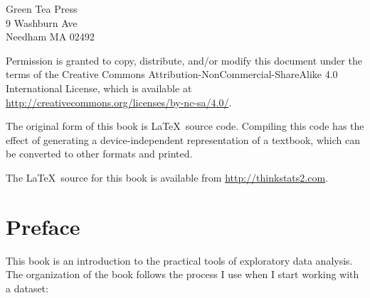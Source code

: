\documentclass[12pt]{book}
\theoremstyle{exercise}
\begin{document}
\begin{titlepage}
{\vspace{0.2in}

\begin{flushleft}
Green Tea Press \\
9 Washburn Ave \\
Needham MA 02492
\end{flushleft}

Permission is granted to copy, distribute, and/or modify this document
under the terms of the Creative Commons
Attribution-NonCommercial-ShareAlike 4.0 International License, which
is available at
\url{http://creativecommons.org/licenses/by-nc-sa/4.0/}.

The original form of this book is \LaTeX\ source code.  Compiling this
code has the effect of generating a device-independent representation
of a textbook, which can be converted to other formats and printed.

The \LaTeX\ source for this book is available from
\url{http://thinkstats2.com}.

\vspace{0.2in}

} %

\end{titlepage}

\chapter{Preface}%
\label{preface}

This book is an
introduction to the practical tools of exploratory data analysis.
The organization of the book follows the process I use
when I start working with a dataset:
\end{document}
